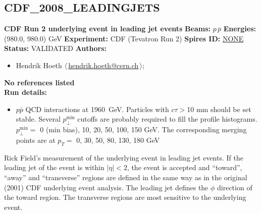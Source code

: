 \subsection{CDF\_2008\_LEADINGJETS}
\textbf{CDF Run 2 underlying event in leading jet events}\newline
\textbf{Beams:} $p$\,$\bar{p}$ \newline
\textbf{Energies:} (980.0, 980.0) GeV \newline
\textbf{Experiment:} CDF (Tevatron Run 2) \newline
\textbf{Spires ID:} \href{http://www.slac.stanford.edu/spires/find/hep/www?rawcmd=key+NONE}{NONE}\newline
\textbf{Status:} VALIDATED\newline
\textbf{Authors:}
\begin{itemize}
  \item Hendrik Hoeth $\langle\,$\href{mailto:hendrik.hoeth@cern.ch}{hendrik.hoeth@cern.ch}$\,\rangle$;
\end{itemize}
\textbf{No references listed}\\ 
\textbf{Run details:}
\begin{itemize}

  \item $p\bar{p}$ QCD interactions at 1960~GeV. Particles with $c \tau > {}$10 mm should be set stable. Several $p_\perp^\text{min}$ cutoffs are probably required to fill the profile histograms. $p_\perp^\text{min} = {}$ 0 (min bias), 10, 20, 50, 100, 150 GeV. The corresponding merging points are at $p_T = $ 0, 30, 50, 80, 130, 180 GeV\end{itemize}

\noindent Rick Field's measurement of the underlying event in leading jet events. If the leading jet of the event is within $|\eta| < 2$, the event is accepted and ``toward'', ``away'' and ``transverse'' regions are defined in the same way as in the original (2001) CDF underlying event analysis. The leading jet defines the $\phi$ direction of the toward region. The transverse regions are most sensitive to the underlying event.

\clearpage


\clearpage

